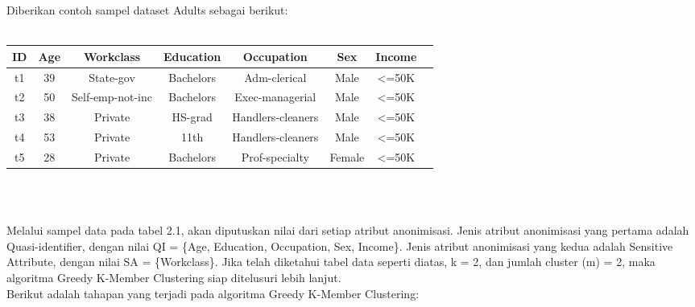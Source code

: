 \noindent Diberikan contoh sampel dataset Adults sebagai berikut:
\\\\
\begin{tabular}{c c c c c c c c}
\hline 
ID & Age & Workclass & Education & Occupation & Sex & Income\\ 
\hline 
t1 & 39 & State-gov & Bachelors & Adm-clerical & Male & <=50K \\ 

t2 & 50 & Self-emp-not-inc & Bachelors & Exec-managerial & Male & <=50K  \\ 

t3 & 38 & Private & HS-grad & Handlers-cleaners & Male & <=50K  \\ 

t4 & 53 & Private & 11th & Handlers-cleaners & Male & <=50K  \\ 
 
t5 & 28 & Private & Bachelors & Prof-specialty & Female & <=50K	 \\ 
\hline 
\end{tabular} 
\\\\
\par Melalui sampel data pada tabel 2.1, akan diputuskan nilai dari setiap atribut anonimisasi. Jenis atribut anonimisasi yang pertama adalah Quasi-identifier, dengan nilai QI = \{Age, Education, Occupation, Sex, Income\}. Jenis atribut anonimisasi yang kedua adalah Sensitive Attribute, dengan nilai SA = \{Workclass\}. Jika telah diketahui tabel data seperti diatas, k = 2, dan jumlah cluster (m) = 2, maka algoritma Greedy K-Member Clustering siap ditelusuri lebih lanjut.\\

\noindent Berikut adalah tahapan yang terjadi pada algoritma Greedy K-Member Clustering:

